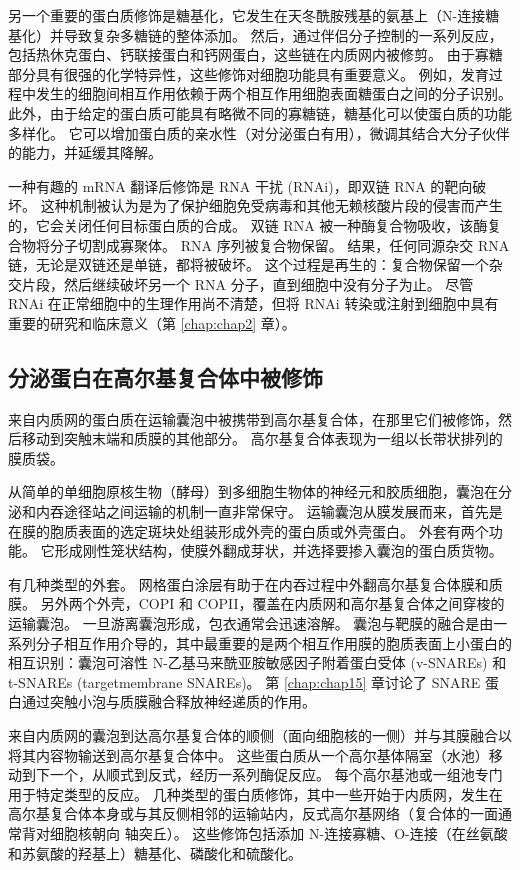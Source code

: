 另一个重要的蛋白质修饰是糖基化，它发生在天冬酰胺残基的氨基上（N-连接糖基化）并导致复杂多糖链的整体添加。 
然后，通过伴侣分子控制的一系列反应，包括热休克蛋白、钙联接蛋白和钙网蛋白，这些链在内质网内被修剪。 
由于寡糖部分具有很强的化学特异性，这些修饰对细胞功能具有重要意义。 
例如，发育过程中发生的细胞间相互作用依赖于两个相互作用细胞表面糖蛋白之间的分子识别。 
此外，由于给定的蛋白质可能具有略微不同的寡糖链，糖基化可以使蛋白质的功能多样化。 
它可以增加蛋白质的亲水性（对分泌蛋白有用），微调其结合大分子伙伴的能力，并延缓其降解。


一种有趣的 mRNA 翻译后修饰是 RNA 干扰 (RNAi)，即双链 RNA 的靶向破坏。 
这种机制被认为是为了保护细胞免受病毒和其他无赖核酸片段的侵害而产生的，它会关闭任何目标蛋白质的合成。 
双链 RNA 被一种酶复合物吸收，该酶复合物将分子切割成寡聚体。 
RNA 序列被复合物保留。 
结果，任何同源杂交 RNA 链，无论是双链还是单链，都将被破坏。 
这个过程是再生的：复合物保留一个杂交片段，然后继续破坏另一个 RNA 分子，直到细胞中没有分子为止。 
尽管 RNAi 在正常细胞中的生理作用尚不清楚，但将 RNAi 转染或注射到细胞中具有重要的研究和临床意义（第 \ref{chap:chap2} 章）。


\subsection{分泌蛋白在高尔基复合体中被修饰}

来自内质网的蛋白质在运输囊泡中被携带到高尔基复合体，在那里它们被修饰，然后移动到突触末端和质膜的其他部分。 
高尔基复合体表现为一组以长带状排列的膜质袋。


从简单的单细胞原核生物（酵母）到多细胞生物体的神经元和胶质细胞，囊泡在分泌和内吞途径站之间运输的机制一直非常保守。 
运输囊泡从膜发展而来，首先是在膜的胞质表面的选定斑块处组装形成外壳的蛋白质或外壳蛋白。 
外套有两个功能。 
它形成刚性笼状结构，使膜外翻成芽状，并选择要掺入囊泡的蛋白质货物。


有几种类型的外套。 
网格蛋白涂层有助于在内吞过程中外翻高尔基复合体膜和质膜。 
另外两个外壳，COPI 和 COPII，覆盖在内质网和高尔基复合体之间穿梭的运输囊泡。 
一旦游离囊泡形成，包衣通常会迅速溶解。 
囊泡与靶膜的融合是由一系列分子相互作用介导的，其中最重要的是两个相互作用膜的胞质表面上小蛋白的相互识别：囊泡可溶性 N-乙基马来酰亚胺敏感因子附着蛋白受体 (v-SNAREs) 和 t-SNAREs (targetmembrane SNAREs)。 
第 \ref{chap:chap15} 章讨论了 SNARE 蛋白通过突触小泡与质膜融合释放神经递质的作用。


来自内质网的囊泡到达高尔基复合体的顺侧（面向细胞核的一侧）并与其膜融合以将其内容物输送到高尔基复合体中。 
这些蛋白质从一个高尔基体隔室（水池）移动到下一个，从顺式到反式，经历一系列酶促反应。 
每个高尔基池或一组池专门用于特定类型的反应。 
几种类型的蛋白质修饰，其中一些开始于内质网，发生在高尔基复合体本身或与其反侧相邻的运输站内，反式高尔基网络（复合体的一面通常背对细胞核朝向 轴突丘）。 
这些修饰包括添加 N-连接寡糖、O-连接（在丝氨酸和苏氨酸的羟基上）糖基化、磷酸化和硫酸化。



